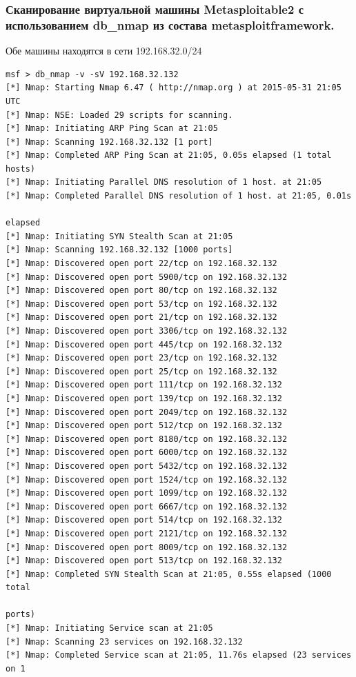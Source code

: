 \documentclass[a4paper, 14pt]{article}				%
\begin{document}
\subsubsection{Сканирование виртуальной машины Metasploitable2 с использованием db\_nmap из состава metasploitframework.}
Обе машины находятся в сети 192.168.32.0/24
\begin{Verbatim}[frame=single]
msf > db_nmap -v -sV 192.168.32.132
[*] Nmap: Starting Nmap 6.47 ( http://nmap.org ) at 2015-05-31 21:05 UTC
[*] Nmap: NSE: Loaded 29 scripts for scanning.
[*] Nmap: Initiating ARP Ping Scan at 21:05
[*] Nmap: Scanning 192.168.32.132 [1 port]
[*] Nmap: Completed ARP Ping Scan at 21:05, 0.05s elapsed (1 total hosts)
[*] Nmap: Initiating Parallel DNS resolution of 1 host. at 21:05
[*] Nmap: Completed Parallel DNS resolution of 1 host. at 21:05, 0.01s
                                                                      elapsed
[*] Nmap: Initiating SYN Stealth Scan at 21:05
[*] Nmap: Scanning 192.168.32.132 [1000 ports]
[*] Nmap: Discovered open port 22/tcp on 192.168.32.132
[*] Nmap: Discovered open port 5900/tcp on 192.168.32.132
[*] Nmap: Discovered open port 80/tcp on 192.168.32.132
[*] Nmap: Discovered open port 53/tcp on 192.168.32.132
[*] Nmap: Discovered open port 21/tcp on 192.168.32.132
[*] Nmap: Discovered open port 3306/tcp on 192.168.32.132
[*] Nmap: Discovered open port 445/tcp on 192.168.32.132
[*] Nmap: Discovered open port 23/tcp on 192.168.32.132
[*] Nmap: Discovered open port 25/tcp on 192.168.32.132
[*] Nmap: Discovered open port 111/tcp on 192.168.32.132
[*] Nmap: Discovered open port 139/tcp on 192.168.32.132
[*] Nmap: Discovered open port 2049/tcp on 192.168.32.132
[*] Nmap: Discovered open port 512/tcp on 192.168.32.132
[*] Nmap: Discovered open port 8180/tcp on 192.168.32.132
[*] Nmap: Discovered open port 6000/tcp on 192.168.32.132
[*] Nmap: Discovered open port 5432/tcp on 192.168.32.132
[*] Nmap: Discovered open port 1524/tcp on 192.168.32.132
[*] Nmap: Discovered open port 1099/tcp on 192.168.32.132
[*] Nmap: Discovered open port 6667/tcp on 192.168.32.132
[*] Nmap: Discovered open port 514/tcp on 192.168.32.132
[*] Nmap: Discovered open port 2121/tcp on 192.168.32.132
[*] Nmap: Discovered open port 8009/tcp on 192.168.32.132
[*] Nmap: Discovered open port 513/tcp on 192.168.32.132
[*] Nmap: Completed SYN Stealth Scan at 21:05, 0.55s elapsed (1000 total
                                                                       ports)
[*] Nmap: Initiating Service scan at 21:05
[*] Nmap: Scanning 23 services on 192.168.32.132
[*] Nmap: Completed Service scan at 21:05, 11.76s elapsed (23 services on 1

\end{Verbatim}
\end{document}
